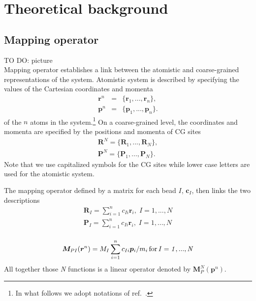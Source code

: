 \chapter{Theoretical background}

\section{Mapping operator}
\label{sec:mapping_operator}
TO DO: picture \\

Mapping operator establishes a link between the atomistic and coarse-grained representations of the system. Atomistic system is described by specifying the values of the Cartesian coordinates and momenta  
\begin{eqnarray}
\bm r^n &=& \{\bm r_1,...,\bm r_n\}, \\
\bm p^n &=& \{\bm p_1,...,\bm p_n\}.
\end{eqnarray}
of the $n$ atoms in the system.\footnote{In what follows we adopt notations of ref.~\cite{Noid:2008.1}.} 
%
On a coarse-grained level, the coordinates and momenta are specified by the positions and momenta of CG sites 
\begin{eqnarray}
\bm R^N = \{\bm R_1,...,\bm R_N\}, \\ 
\bm P^N = \{\bm P_1,...,\bm P_N\}.
\end{eqnarray}
Note that we use capitalized symbols for the CG sites while lower case letters are used for the atomistic system.

The mapping operator defined by a matrix for each bead $I$, ${\bm c}_I$, then links the two descriptions
\begin{eqnarray}
 {\bm R}_I = \sum_{i=1}^{n}c_{Ii}\bm r_i, \; I = 1,...,N \\
 {\bm P}_I = \sum_{i=1}^{n}c_{Ii}\bm r_i, \; I = 1,...,N \\
\label{eq:mapping_scheme}
\end{eqnarray}

\begin{equation}
 \bm M_{PI}(\bm r^n)=M_I\sum_{i=1}^{n}c_{Ii}\bm p_i/m_i \, \rm for\, \it I = 1,...,N
\end{equation}
All together those {\it N} functions is a linear operator denoted by $\bm M_P^N(\bm p^n)$.

